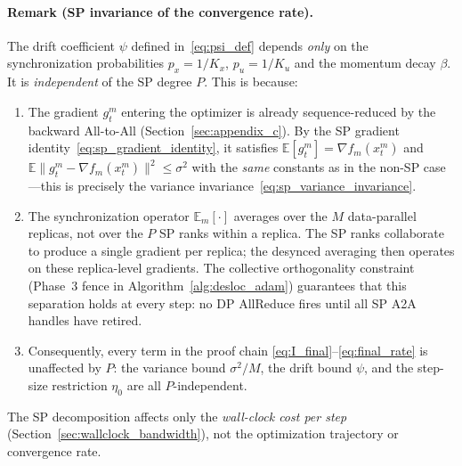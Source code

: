 \documentclass{article}
\begin{document}
\paragraph{Remark (SP invariance of the convergence rate).}
The drift coefficient $\psi$ defined in~\eqref{eq:psi_def} depends
\emph{only} on the synchronization probabilities $p_x = 1/K_x$,
$p_u = 1/K_u$ and the momentum decay $\beta$. It is
\emph{independent} of the SP degree $P$. This is because:
\begin{enumerate}
\item The gradient $g_t^m$ entering the optimizer is already
  sequence-reduced by the backward All-to-All (Section~\ref{sec:appendix_c}).
  By the SP gradient identity~\eqref{eq:sp_gradient_identity},
  it satisfies $\mathbb{E}[g_t^m] = \nabla f_m(x_t^m)$ and
  $\mathbb{E}\|g_t^m - \nabla f_m(x_t^m)\|^2 \leq \sigma^2$
  with the \emph{same} constants as in the non-SP case---this
  is precisely the variance invariance~\eqref{eq:sp_variance_invariance}.
\item The synchronization operator $\mathbb{E}_m[\cdot]$ averages
  over the $M$ data-parallel replicas, not over the $P$ SP ranks
  within a replica. The SP ranks collaborate to produce a single
  gradient per replica; the desynced averaging then operates on
  these replica-level gradients.
  The collective orthogonality constraint (Phase~3 fence in
  Algorithm~\ref{alg:desloc_adam}) guarantees that this separation
  holds at every step: no DP AllReduce fires until all SP A2A
  handles have retired.
\item Consequently, every term in the proof chain
  \eqref{eq:I_final}--\eqref{eq:final_rate}
  is unaffected by $P$: the variance bound $\sigma^2/M$, the
  drift bound $\psi$, and the step-size restriction $\eta_0$ are
  all $P$-independent.
\end{enumerate}
The SP decomposition affects only the \emph{wall-clock cost per step}
(Section~\ref{sec:wallclock_bandwidth}), not the optimization trajectory
or convergence rate.
\end{document}
